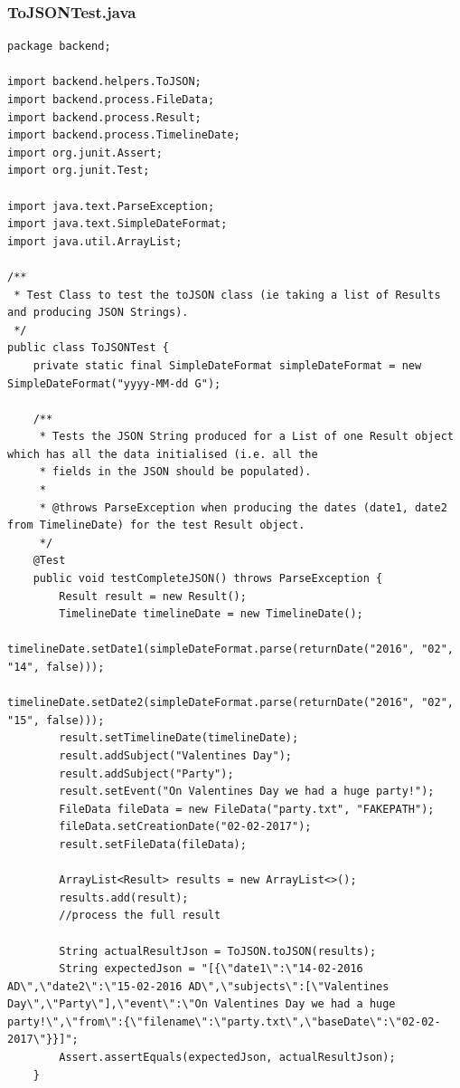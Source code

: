 \subsubsection{ToJSONTest.java}
\begin{lstlisting}
package backend;

import backend.helpers.ToJSON;
import backend.process.FileData;
import backend.process.Result;
import backend.process.TimelineDate;
import org.junit.Assert;
import org.junit.Test;

import java.text.ParseException;
import java.text.SimpleDateFormat;
import java.util.ArrayList;

/**
 * Test Class to test the toJSON class (ie taking a list of Results and producing JSON Strings).
 */
public class ToJSONTest {
    private static final SimpleDateFormat simpleDateFormat = new SimpleDateFormat("yyyy-MM-dd G");

    /**
     * Tests the JSON String produced for a List of one Result object which has all the data initialised (i.e. all the
     * fields in the JSON should be populated).
     *
     * @throws ParseException when producing the dates (date1, date2 from TimelineDate) for the test Result object.
     */
    @Test
    public void testCompleteJSON() throws ParseException {
        Result result = new Result();
        TimelineDate timelineDate = new TimelineDate();
        timelineDate.setDate1(simpleDateFormat.parse(returnDate("2016", "02", "14", false)));
        timelineDate.setDate2(simpleDateFormat.parse(returnDate("2016", "02", "15", false)));
        result.setTimelineDate(timelineDate);
        result.addSubject("Valentines Day");
        result.addSubject("Party");
        result.setEvent("On Valentines Day we had a huge party!");
        FileData fileData = new FileData("party.txt", "FAKEPATH");
        fileData.setCreationDate("02-02-2017");
        result.setFileData(fileData);

        ArrayList<Result> results = new ArrayList<>();
        results.add(result);
        //process the full result

        String actualResultJson = ToJSON.toJSON(results);
        String expectedJson = "[{\"date1\":\"14-02-2016 AD\",\"date2\":\"15-02-2016 AD\",\"subjects\":[\"Valentines Day\",\"Party\"],\"event\":\"On Valentines Day we had a huge party!\",\"from\":{\"filename\":\"party.txt\",\"baseDate\":\"02-02-2017\"}}]";
        Assert.assertEquals(expectedJson, actualResultJson);
    }


\end{lstlisting}
